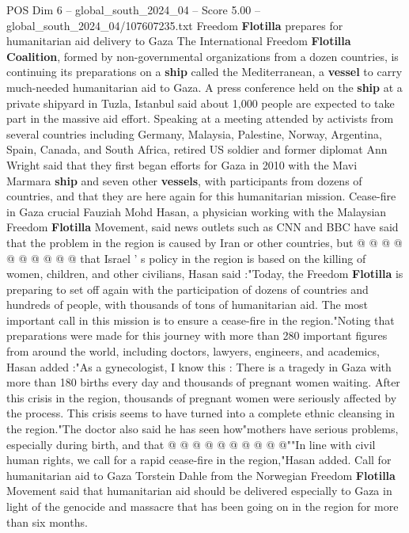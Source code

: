 \begin{textsample}{POS Dim 6 – global\_south\_2024\_04 – Score 5.00 – global\_south\_2024\_04/107607235.txt}  \label{ex:f6_pos_130}
Freedom \textbf{Flotilla} prepares for humanitarian aid delivery to Gaza The International Freedom \textbf{Flotilla} \textbf{Coalition}, formed by non-governmental organizations from a dozen countries, is continuing its preparations on a \textbf{ship} called the Mediterranean, a \textbf{vessel} to carry much-needed humanitarian aid to Gaza.
A press conference held on the \textbf{ship} at a private shipyard in Tuzla, Istanbul said about 1,000 people are expected to take part in the massive aid effort.
Speaking at a meeting attended by activists from several countries including Germany, Malaysia, Palestine, Norway, Argentina, Spain, Canada, and South Africa, retired US soldier and former diplomat Ann Wright said that they first began efforts for Gaza in 2010 with the Mavi Marmara \textbf{ship} and seven other \textbf{vessels}, with participants from dozens of countries, and that they are here again for this humanitarian mission.
Cease-fire in Gaza crucial Fauziah Mohd Hasan, a physician working with the Malaysian Freedom \textbf{Flotilla} Movement, said news outlets such as CNN and BBC have said that the problem in the region is caused by Iran or other countries, but @ @ @ @ @ @ @ @ @ @ that Israel ' s policy in the region is based on the killing of women, children, and other civilians, Hasan said :"Today, the Freedom \textbf{Flotilla} is preparing to set off again with the participation of dozens of countries and hundreds of people, with thousands of tons of humanitarian aid.
The most important call in this mission is to ensure a cease-fire in the region."Noting that preparations were made for this journey with more than 280 important figures from around the world, including doctors, lawyers, engineers, and academics, Hasan added :"As a gynecologist, I know this : There is a tragedy in Gaza with more than 180 births every day and thousands of pregnant women waiting.
After this crisis in the region, thousands of pregnant women were seriously affected by the process.
This crisis seems to have turned into a complete ethnic cleansing in the region."The doctor also said he has seen how"mothers have serious problems, especially during birth, and that @ @ @ @ @ @ @ @ @ @""In line with civil human rights, we call for a rapid cease-fire in the region,"Hasan added.
Call for humanitarian aid to Gaza Torstein Dahle from the Norwegian Freedom \textbf{Flotilla} Movement said that humanitarian aid should be delivered especially to Gaza in light of the genocide and massacre that has been going on in the region for more than six months.

\end{textsample}
